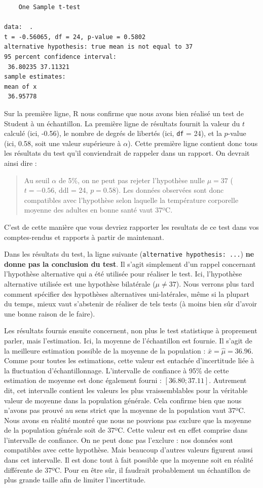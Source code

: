 \documentclass[
  a4paper,
]{article}
\begin{document}
\begin{verbatim}
    One Sample t-test

data:  .
t = -0.56065, df = 24, p-value = 0.5802
alternative hypothesis: true mean is not equal to 37
95 percent confidence interval:
 36.80235 37.11321
sample estimates:
mean of x 
 36.95778 
\end{verbatim}

Sur la première ligne, R nous confirme que nous avons bien réalisé un test de Student à un échantillon. La première ligne de résultats fournit la valeur du \(t\) calculé (ici, -0.56), le nombre de degrés de libertés (ici, \texttt{df} = 24), et la \(p\)-value (ici, 0.58, soit une valeur supérieure à \(\alpha\)). Cette première ligne contient donc tous les résultats du test qu'il conviendrait de rappeler dans un rapport. On devrait ainsi dire :

\begin{quote}
Au seuil \(\alpha\) de 5\%, on ne peut pas rejeter l'hypothèse nulle \(\mu = 37\) (\(t = -0.56\), ddl = 24, \(p = 0.58\)). Les données observées sont donc compatibles avec l'hypothèse selon laquelle la température corporelle moyenne des adultes en bonne santé vaut 37ºC.
\end{quote}

C'est de cette manière que vous devriez rapporter les resultats de ce test dans vos comptes-rendus et rapports à partir de maintenant.

Dans les résultats du test, la ligne suivante (\texttt{alternative\ hypothesis:\ ...}) \textbf{ne donne pas la conclusion du test}. Il s'agit simplement d'un rappel concernant l'hypothèse alternative qui a été utilisée pour réaliser le test. Ici, l'hypothèse alternative utilisée est une hypothèse bilatérale (\(\mu \neq 37\)). Nous verrons plus tard comment spécifier des hypothèses alternatives uni-latérales, même si la plupart du temps, mieux vaut s'abstenir de réaliser de tels tests (à moins bien sûr d'avoir une bonne raison de le faire).

Les résultats fournis ensuite concernent, non plus le test statistique à proprement parler, mais l'estimation. Ici, la moyenne de l'échantillon est fournie. Il s'agit de la meilleure estimation possible de la moyenne de la population : \(\bar{x} = \hat{\mu} = 36.96\). Comme pour toutes les estimations, cette valeur est entachée d'incertitude liée à la fluctuation d'échantillonnage. L'intervalle de confiance à 95\% de cette estimation de moyenne est donc également fourni : \([36.80 ; 37.11]\). Autrement dit, cet intervalle contient les valeurs les plus vraissemblables pour la véritable valeur de moyenne dans la population générale. Cela confirme bien que nous n'avons pas prouvé au sens strict que la moyenne de la population vaut 37ºC. Nous avons en réalité montré que nous ne pouvions pas exclure que la moyenne de la population générale soit de 37ºC. Cette valeur est en effet comprise dans l'intervalle de confiance. On ne peut donc pas l'exclure : nos données sont compatibles avec cette hypothèse. Mais beaucoup d'autres valeurs figurent aussi dans cet intervalle. Il est donc tout à fait possible que la moyenne soit en réalité différente de 37ºC. Pour en être sûr, il faudrait probablement un échantillon de plus grande taille afin de limiter l'incertitude.
\end{document}
